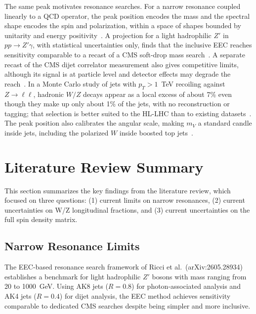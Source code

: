 \documentclass[11pt]{article}
\begin{document}
The same peak motivates resonance searches.
For a narrow resonance coupled linearly to a QCD operator, the peak position encodes the mass and the spectral shape encodes the spin and polarization, within a space of shapes bounded by unitarity and energy positivity~\cite{Ricci:2026fkj}.
A projection for a light hadrophilic \(Z'\) in \(pp \to Z'\gamma\), with statistical uncertainties only, finds that the inclusive EEC reaches sensitivity comparable to a recast of a CMS soft-drop mass search~\cite{Ricci:2026fkj}.
A separate recast of the CMS dijet correlator measurement also gives competitive limits, although its signal is at particle level and detector effects may degrade the reach~\cite{Ricci:2026fkj}.
In a Monte Carlo study of jets with \(p_T > 1\)~TeV recoiling against \(Z \to \ell\ell\), hadronic \(W/Z\) decays appear as a local excess of about 7\% even though they make up only about 1\% of the jets, with no reconstruction or tagging; that selection is better suited to the HL-LHC than to existing datasets~\cite{Gao:2026hoj}.
The peak position also calibrates the angular scale, making \(m_V\) a standard candle inside jets, including the polarized \(W\) inside boosted top jets~\cite{Gao:2026hoj}.


\section{Literature Review Summary}

This section summarizes the key findings from the literature review, which focused on three questions:
(1) current limits on narrow resonances, (2) current uncertainties on W/Z longitudinal fractions, and (3) current uncertainties on the full spin density matrix.

\subsection{Narrow Resonance Limits}

The EEC-based resonance search framework of Ricci et al.\ (arXiv:2605.28934) establishes a benchmark for light hadrophilic $Z'$ bosons with mass ranging from 20 to 1000~GeV.
Using AK8 jets ($R=0.8$) for photon-associated analysis and AK4 jets ($R=0.4$) for dijet analysis, the EEC method achieves sensitivity comparable to dedicated CMS searches despite being simpler and more inclusive.
\end{document}
